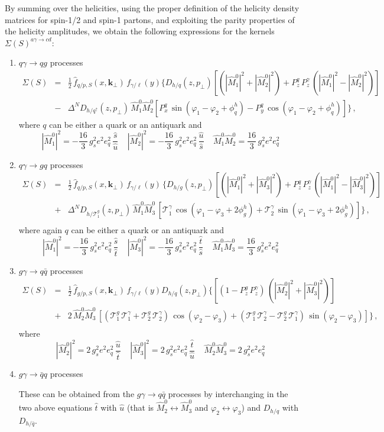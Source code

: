 \documentclass[nofootinbib,superscriptaddress,aps]{revtex4}
\newcommand{\be}{\begin{equation}}
\newcommand{\ee}{\end{equation}}
\newcommand{\bea}{\begin{eqnarray}}
\newcommand{\eea}{\end{eqnarray}}
\begin{document}
By summing over the helicities, using the proper definition of the helicity density matrices for spin-1/2 and spin-1 partons, and exploiting the parity properties of the helicity amplitudes, we obtain the following expressions for the kernels $\Sigma(S)^{a\gamma\to cd} $:
\begin{enumerate}
\item $q\gamma\to q g$ processes
 \bea
\Sigma(S) &=& \frac{1}{2}\,\hat f_{q/p,S}(x,\bm{k}_{\perp})\, f_{\gamma/\ell}(y) \Big\{D_{h/q}(z,p_\perp) [(|\hat{M}^0_1|^2 + |\hat{M}^0_2|^2)+
P_z^q\,P_z^\gamma \,(|\hat{M}^0_1|^2 - |\hat{M}^0_2|^2)]\nonumber \\
&-&\Delta^N\!D_{h/q^\uparrow}(z,p_\perp)\,\hat{M}^0_1 \hat{M}^0_2
[P_x^q\,\sin(\varphi_1-\varphi_2 +\phi_q^h) - P_y^q\,\cos(\varphi_1-\varphi_2 +\phi_q^h)]\Big\}\,,\label{qgaqg}
\eea
where $q$ can be either a quark or an antiquark and
\be
\label{Mqgaqg}
|\hat{M}^0_1|^2 = -\frac{16}{3}\,g_s^2 e^2 e_q^2 \,\frac{\hat s}{\hat u} \>\>\>\>\> |\hat{M}^0_2|^2 = -\frac{16}{3}\, g_s^2 e^2 e_q^2\, \frac{\hat u}{\hat s} \>\>\>\>\>  \hat{M}^0_1 \hat{M}^0_2 = \frac{16}{3}\, g_s^2  e^2 e_q^2
\ee
%
\item $q\gamma\to g q$ processes
\bea
\Sigma(S) &=& \frac{1}{2}\,\hat f_{q/p,S}(x,\bm{k}_{\perp})\, f_{\gamma/\ell}(y)\,\Big \{D_{h/g}(z,p_\perp)[ (|\hat{M}^0_1|^2 + |\hat{M}^0_3|^2)+
P_z^q \, P_z^\gamma \,(|\hat{M}^0_1|^2 - |\hat{M}^0_3|^2)]\nonumber \\
&+& \Delta^N\!D_{h/\mathcal{T}_1^g}(z,p_\perp)\,\hat{M}^0_1 \hat{M}^0_3
\,[\mathcal{T}_1^\gamma\,\cos(\varphi_1-\varphi_3 +2\phi_g^h) + \mathcal{T}_2^\gamma\,\sin(\varphi_1-\varphi_3 +2\phi_g^h)]\Big\}\,,\nonumber\\
&&\label{qgagq}
\eea
where again $q$ can be either a quark or an antiquark and
\be
\label{Mqgagq}
|\hat{M}^0_1|^2 = -\frac{16}{3}\,g_s^2e^2e_q^2 \,\frac{\hat s}{\hat t} \>\>\>\>\> |\hat{M}^0_3|^2 = -\frac{16}{3}\,g_s^2e^2e_q^2\, \frac{\hat t}{\hat s} \>\>\>\>\>  \hat{M}^0_1 \hat{M}^0_3 = \frac{16}{3}\,g_s^2e^2e_q^2
\ee
%
\item $g\gamma\to q\bar q$ processes
\bea
\Sigma(S) &=& \frac{1}{2}\, \hat f_{g/p,S}(x,\bm{k}_{\perp}) \, f_{\gamma/\ell}(y) D_{h/q}(z,p_\perp) \Big\{[(1-P_z^g\,P_z^\gamma) \, (|\hat{M}^0_2|^2 + |\hat{M}^0_3|^2)]\nonumber \\
&+& 2\,\hat{M}^0_2 \hat{M}^0_3
\,[(\mathcal{T}_1^g\,\mathcal{T}_1^\gamma + \mathcal{T}_2^g\,\mathcal{T}_2^\gamma)\,\cos(\varphi_2-\varphi_3) + (\mathcal{T}_1^g\,\mathcal{T}_2^\gamma - \mathcal{T}_2^g\,\mathcal{T}_1^\gamma)\,\sin(\varphi_2-\varphi_3)]\Big\}\,,\nonumber\\
&& \label{ggaqqb}
\eea
where
\be
\label{Mggaqqb}
|\hat{M}^0_2|^2 = 2\,g_s^2e^2e_q^2\, \frac{\hat u}{\hat t} \>\>\>\>\> |\hat{M}^0_3|^2 = 2\,g_s^2e^2e_q^2 \,\frac{\hat t}{\hat u} \>\>\>\>\>  \hat{M}^0_2 \hat{M}^0_3 = 2\,g_s^2e^2e_q^2
\ee
\item $g\gamma\to\bar q q$ processes

These can be obtained from the $g\gamma\to q\bar q$ processes by interchanging in the two above equations $\hat t$ with $\hat u$  (that is $\hat{M}^0_2 \leftrightarrow\hat{M}^0_3$ and $\varphi_2 \leftrightarrow \varphi_3$) and $D_{h/q}$ with $D_{h/\bar q}$.
\end{enumerate}
\end{document}
